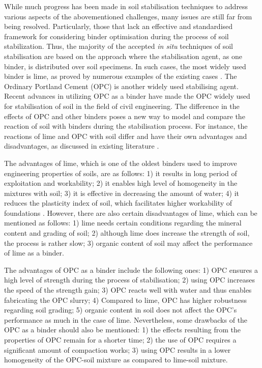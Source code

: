 \documentclass[eprint,
]{actapoly}
\begin{document}
While much progress has been made in soil stabilisation techniques to address various aspects of the abovementioned challenges, many issues are still far from being resolved. Particularly, those that lack an effective and standardised framework for considering binder optimisation during the process of soil stabilization. Thus, the majority of the accepted \emph{in situ} techniques of soil stabilisation are based on the approach where the stabilisation agent, as one binder, is distributed over soil specimens. In such cases, the most widely used binder is lime, as proved by numerous examples of the existing cases \citep{Greaves,RaoThyagaraj,Rogersetal2000,ATTOHOKINE1995283,ROBIN2014211,Harichane,GlendinningRogers}. The Ordinary Portland Cement (OPC) is another widely used stabilising agent. Recent advances in utilizing OPC as a binder \citep{Prusinski,Bhattacharjaetal2003,Lindh202201,Lindh202102,KULKARNI2022125363} have made the OPC widely used for stabilisation of soil in the field of civil engineering. The difference in the effects of OPC and other binders poses a new way to model and compare the reaction of soil with binders during the stabilisation process. For instance, the reactions of lime and OPC with soil differ and have their own advantages and disadvantages, as discussed in existing literature \citep{Mahedi,KOLIAS2005301,BARMAN20221319,Lindhetal2000,Chewetal2004,KOOHMISHI2022100726}. 

The advantages of lime, which is one of the oldest binders used to improve engineering properties of soils, are as follows: 1) it results in long period of exploitation and workability; 2) it enables high level of homogeneity in the mixtures with soil; 3) it is effective in decreasing the amount of water; 4) it reduces the plasticity index of soil, which facilitates higher workability of foundations \cite{LindhLemenkovaCEE}. However, there are also certain disadvantages of lime, which can be mentioned as follows: 1) lime needs certain conditions regarding the mineral content and grading of soil; 2) although lime does increase the strength of soil, the process is rather slow; 3) organic content of soil may affect the performance of lime as a binder.

The advantages of OPC as a binder include the following ones: 1) OPC ensures a high level of strength during the process of stabilisation; 2) using OPC increases the speed of the strength gain; 3) OPC reacts well with water and thus enables fabricating the OPC slurry; 4) Compared to lime, OPC has higher robustness regarding soil grading; 5) organic content in soil does not affect the OPC's performance as much in the case of lime. Nevertheless, some drawbacks of the OPC as a binder should also be mentioned: 1) the effects resulting from the properties of OPC remain for a shorter time; 2) the use of OPC requires a significant amount of compaction works; 3) using OPC results in a lower homogeneity of the OPC-soil mixture as compared to lime-soil mixture.
\end{document}
